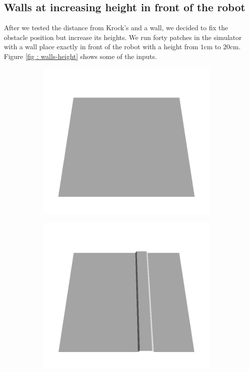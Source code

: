 \subsection{Walls at increasing height in front of the robot}
After we tested the distance from Krock's and a wall, we decided to fix the obstacle position but increase its heights.  We run forty patches in the simulator with a wall place exactly in front of the robot with a height from $1$cm to $20$cm. Figure \ref{fig : walls-height} shows some of the inputs.

\begin{figure}[htbp]
    \centering
    \begin{subfigure}[b]{0.24\linewidth}
    \includegraphics[width=\linewidth]{../img/5/custom_patches/walls_increasing/all/00-3d.png}
    \end{subfigure}
    \begin{subfigure}[b]{0.24\linewidth}
    \includegraphics[width=\linewidth]{../img/5/custom_patches/walls_increasing/all/03-3d.png}

\end{subfigure}
\end{figure}
